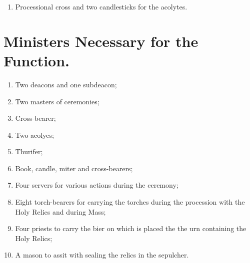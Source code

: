 \documentclass[letterpaper]{report}
\begin{document}
{\begin{enumerate}[label=\Roman*.]
\begin{enumerate}[label=\arabic*.]
                \item Processional cross and two candlesticks for the acolytes.

            \end{enumerate}

    \end{enumerate}

    \section{Ministers Necessary for the Function.}

    \begin{enumerate}[label=\Roman*.]

        \item Two deacons and one subdeacon;

        \item Two masters of ceremonies;

        \item Cross-bearer;

        \item Two acolyes;

        \item Thurifer;

        \item Book, candle, miter and cross-bearers;

        \item Four servers for various actions during the ceremony;

        \item Eight torch-bearers for carrying the torches during the
            procession with the Holy Relics and during Mass;

        \item Four priests to carry the bier on which is placed the the urn
            containing the Holy Relics;

        \item A mason to assit with sealing the relics in the sepulcher.

    \end{enumerate}

}
\end{document}

